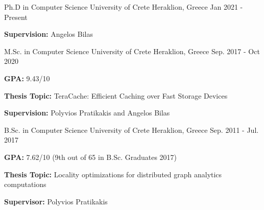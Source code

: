 
\begin{cventries}

  \cventry
    {Ph.D in Computer Science} %
    {University of Crete} %
    {Heraklion, Greece} %
    {Jan 2021 - Present} %
    {
      \begin{cvitems} %
        \item{\textbf{Supervision:} Angelos Bilas}
      \end{cvitems}
    }
  \cventry
    {M.Sc. in Computer Science} %
    {University of Crete} %
    {Heraklion, Greece} %
    {Sep. 2017 - Oct 2020} %
    {
      \begin{cvitems} %
      \item{\textbf{GPA:} 9.43/10}
      \item{\textbf{Thesis Topic:} 
         TeraCache: Efficient Caching over Fast Storage Devices}
        \item{\textbf{Supervision:} Polyvios Pratikakis and Angelos Bilas}
      \end{cvitems}
    }

  \cventry
    {B.Sc. in Computer Science} %
    {University of Crete} %
    {Heraklion, Greece} %
    {Sep. 2011 - Jul. 2017} %
    {
      \begin{cvitems} %
      \item{\textbf{GPA:} 7.62/10 (9th out of 65 in B.Sc. Graduates 2017)}
      \item{\textbf{Thesis Topic:} Locality optimizations for
          distributed graph analytics computations}
        \item{\textbf{Supervisor:} Polyvios Pratikakis}
      \end{cvitems}
    }

\end{cventries}
